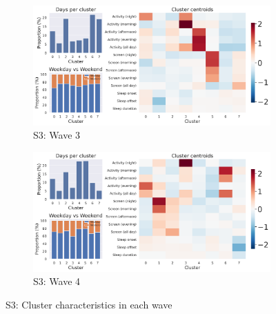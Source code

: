 \begin{appendices}
\begin{figure}[htbp]
  \begin{subfigure}[t]{0.48\textwidth}
    \centering
    \includegraphics[width=\textwidth]{figures/appendix/globem_INS-W_3_summary.png}
    \caption{S3: Wave 3}
    \label{fig:bottom-left}
  \end{subfigure}
  \hfill
  \begin{subfigure}[t]{0.48\textwidth}
    \centering
    \includegraphics[width=\textwidth]{figures/appendix/globem_INS-W_4_summary.png}
    \caption{S3: Wave 4}
    \label{fig:bottom-right}
  \end{subfigure}

  \caption{S3: Cluster characteristics in each wave}
  \label{fig:2x2}
\end{figure}


\end{appendices}